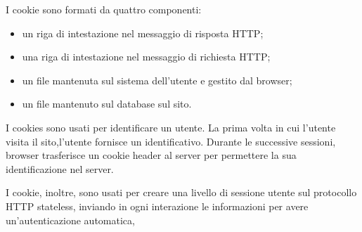 \documentclass{book}
\begin{document}
I cookie sono formati da quattro componenti:
\begin{itemize}
  \item un riga di intestazione nel messaggio di risposta HTTP;
  
  \item una riga di intestazione nel messaggio di richiesta HTTP;
  
  \item un file mantenuta sul sistema dell'utente e gestito dal browser;
  
  \item un file mantenuto sul database sul sito.
\end{itemize}
{}

I cookies sono usati per identificare un utente. La prima volta in cui
l'utente visita il sito,l'utente fornisce un identificativo. Durante le
successive sessioni, browser trasferisce un cookie header al server per
permettere la sua identificazione nel server.

I cookie, inoltre, sono usati per creare una livello di sessione utente sul
protocollo HTTP stateless, inviando in ogni interazione le informazioni per
avere un'autenticazione automatica,
\end{document}
